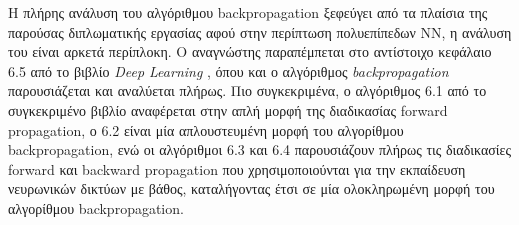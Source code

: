 Η πλήρης ανάλυση του αλγόριθμου backpropagation ξεφεύγει από τα πλαίσια
της παρούσας διπλωματικής εργασίας αφού στην περίπτωση πολυεπίπεδων ΝΝ,
η ανάλυση του είναι αρκετά περίπλοκη. Ο αναγνώστης παραπέμπεται στο αντίστοιχο
κεφάλαιο 6.5 από το βιβλίο \emph{Deep Learning} \cite{Goodfellow-et-al-2016-Book}, όπου και ο αλγόριθμος
\emph{backpropagation} παρουσιάζεται και αναλύεται πλήρως. Πιο συγκεκριμένα,
ο αλγόριθμος 6.1 από το συγκεκριμένο βιβλίο αναφέρεται στην απλή μορφή της διαδικασίας
forward propagation, ο 6.2 είναι μία απλουστευμένη μορφή του αλγορίθμου backpropagation,
ενώ οι αλγόριθμοι 6.3 και 6.4 παρουσιάζουν πλήρως τις διαδικασίες forward και backward
propagation που χρησιμοποιούνται για την εκπαίδευση νευρωνικών δικτύων με βάθος,
καταλήγοντας έτσι σε μία ολοκληρωμένη μορφή του αλγορίθμου backpropagation.

\makeatletter
\newcommand{\HEADER}[1]{\State\underline{\textsc{#1}}\begin{ALC@g}}
\newcommand{\ENDHEADER}{\end{ALC@g}}
\makeatother
\newcommand{\STATEI}[1]{\State
  \begin{tabular}{@{}p{\dimexpr \textwidth-\labelwidth}@{}}%
    \hangindent \algorithmicindent
    \hangafter 1
    #1
  \end{tabular}
}

